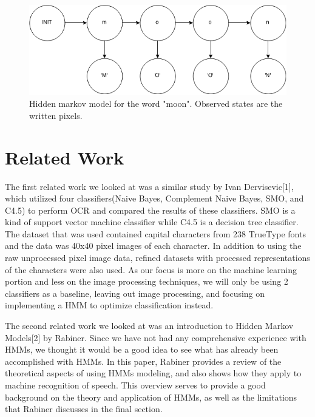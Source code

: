\documentclass{article} %
\begin{document}
\begin{figure}[h]
\begin{center}
\includegraphics[scale=0.5]{ml_project_hmm.png}
\end{center}
\caption{Hidden markov model for the word "moon". Observed states are the written pixels.}
\label{fig:hmm-letters}
\end{figure}

\section{Related Work}
The first related work we looked at was a similar study by Ivan Dervisevic[1], which utilized four classifiers(Naive Bayes, Complement Naive Bayes, SMO, and C4.5) to perform OCR and compared the results of these classifiers. SMO is a kind of support vector machine classifier while C4.5 is a decision tree classifier. The dataset that was used contained capital characters from 238 TrueType fonts and the data was 40x40 pixel images of each character. In addition to using the raw unprocessed pixel image data, refined datasets with processed representations of the characters were also used. As our focus is more on the machine learning portion and less on the image processing techniques, we will only be using 2 classifiers as a baseline, leaving out image processing, and focusing on implementing a HMM to optimize classification instead.

The second related work we looked at was an introduction to Hidden Markov Models[2] by Rabiner. Since we have not had any comprehensive experience with HMMs, we thought it would be a good idea to see what has already been accomplished with HMMs. In this paper, Rabiner provides a review of the theoretical aspects of using HMMs modeling, and also shows how they apply to machine recognition of speech. This overview serves to provide a good background on the theory and application of HMMs, as well as the limitations that Rabiner discusses in the final section.
\end{document}
